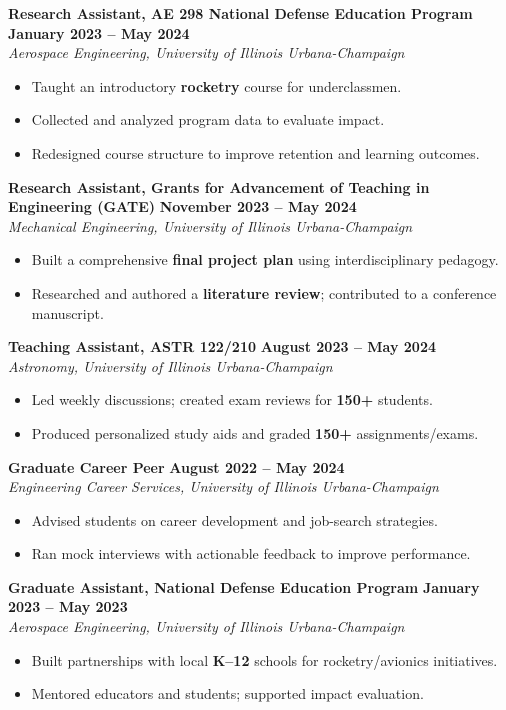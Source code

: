 \documentclass[10pt]{article}
\begin{document}
	\textbf{Research Assistant, AE 298 National Defense Education Program} \hfill \textbf{January 2023 -- May 2024} \\
	\emph{Aerospace Engineering, University of Illinois Urbana-Champaign}
	\begin{itemize}
		\item Taught an introductory \textbf{rocketry} course for underclassmen.
		\item Collected and analyzed program data to evaluate impact.
		\item Redesigned course structure to improve retention and learning outcomes.
	\end{itemize}
	
	\textbf{Research Assistant, Grants for Advancement of Teaching in Engineering (GATE)} \hfill \textbf{November 2023 -- May 2024} \\
	\emph{Mechanical Engineering, University of Illinois Urbana-Champaign}
	\begin{itemize}
		\item Built a comprehensive \textbf{final project plan} using interdisciplinary pedagogy.
		\item Researched and authored a \textbf{literature review}; contributed to a conference manuscript.
	\end{itemize}
	
	\textbf{Teaching Assistant, ASTR 122/210} \hfill \textbf{August 2023 -- May 2024} \\
	\emph{Astronomy, University of Illinois Urbana-Champaign}
	\begin{itemize}
		\item Led weekly discussions; created exam reviews for \textbf{150+} students.
		\item Produced personalized study aids and graded \textbf{150+} assignments/exams.
	\end{itemize}
	
	\textbf{Graduate Career Peer} \hfill \textbf{August 2022 -- May 2024} \\
	\emph{Engineering Career Services, University of Illinois Urbana-Champaign}
	\begin{itemize}
		\item Advised students on career development and job-search strategies.
		\item Ran mock interviews with actionable feedback to improve performance.
	\end{itemize}
	
	\textbf{Graduate Assistant, National Defense Education Program} \hfill \textbf{January 2023 -- May 2023} \\
	\emph{Aerospace Engineering, University of Illinois Urbana-Champaign}
	\begin{itemize}
		\item Built partnerships with local \textbf{K--12} schools for rocketry/avionics initiatives.
		\item Mentored educators and students; supported impact evaluation.
	\end{itemize}
	
\end{document}
